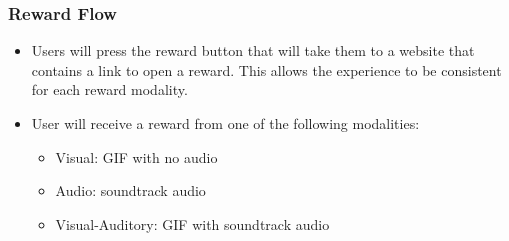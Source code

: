 \subsubsection{Reward Flow} \label{reward_flow}


\begin{itemize}
  \item Users will press the reward button that will take them to a website that contains a link to open a reward. This allows the experience to be consistent for each reward modality.
  \item User will receive a reward from one of the following modalities:
  \begin{itemize}
    \item Visual: GIF with no audio
    \item Audio: soundtrack audio
    \item Visual-Auditory: GIF with soundtrack audio
  \end{itemize}
\end{itemize}

